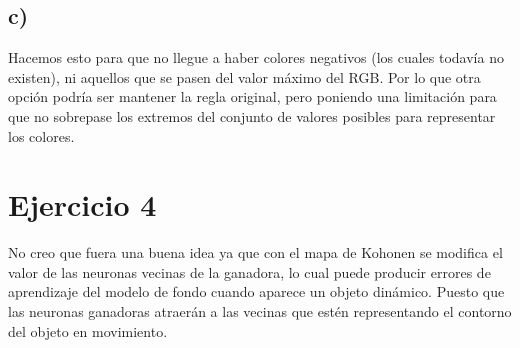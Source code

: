 \documentclass[12pt,a4paper]{article}
\begin{document}
\subsection*{c)}
Hacemos esto para que no llegue a haber colores negativos (los cuales todavía no existen), ni aquellos que se pasen del valor máximo del RGB. Por lo que otra opción podría ser mantener la regla original, pero poniendo una limitación para que no sobrepase los extremos del conjunto de valores posibles para representar los colores.

\section*{Ejercicio 4}
No creo que fuera una buena idea ya que con el mapa de Kohonen se modifica el valor de las neuronas vecinas de la ganadora, lo cual puede producir errores de aprendizaje del modelo de fondo cuando aparece un objeto dinámico. Puesto que las neuronas ganadoras atraerán a las vecinas que estén representando el contorno del objeto en movimiento. 
\end{document}
